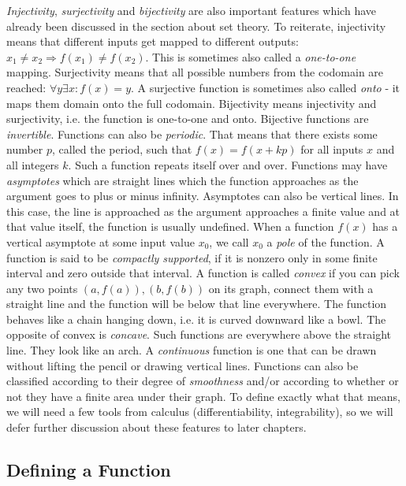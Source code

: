 \emph{Injectivity}, \emph{surjectivity} and \emph{bijectivity} are also important features which have already been discussed in the section about set theory. To reiterate, injectivity means that different inputs get mapped to different outputs: $x_1 \neq x_2 \Rightarrow f(x_1) \neq f(x_2)$. This is sometimes also called a \emph{one-to-one} mapping. Surjectivity means that all possible numbers from the codomain are reached: $\forall y \exists x: f(x) = y$. A surjective function is sometimes also called \emph{onto} - it maps them domain onto the full codomain. Bijectivity means injectivity and surjectivity, i.e. the function is one-to-one and onto. Bijective functions are \emph{invertible}. Functions can also be \emph{periodic}. That means that there exists some number $p$, called the period, such that $f(x) = f(x + k p)$ for all inputs $x$ and all integers $k$. Such a function repeats itself over and over. Functions may have \emph{asymptotes} which are straight lines which the function approaches as the argument goes to plus or minus infinity. Asymptotes can also be vertical lines. In this case, the line is approached as the argument approaches a finite value and at that value itself, the function is usually undefined. When a function $f(x)$ has a vertical asymptote at some input value $x_0$, we call $x_0$ a \emph{pole} of the function. A function is said to be \emph{compactly supported}, if it is nonzero only in some finite interval and zero outside that interval. A function is called \emph{convex} if you can pick any two points $(a,f(a)),(b,f(b))$ on its graph, connect them with a straight line and the function will be below that line everywhere. The function behaves like a chain hanging down, i.e. it is curved downward like a bowl. The opposite of convex is \emph{concave}. Such functions are everywhere above the straight line. They look like an arch. A \emph{continuous} function is one that can be drawn without lifting the pencil or drawing vertical lines. Functions can also be classified according to their degree of \emph{smoothness} and/or according to whether or not they have a finite area under their graph. To define exactly what that means, we will need a few tools from calculus (differentiability, integrability), so we will defer further discussion about these features to later chapters.


\subsection{Defining a Function}

